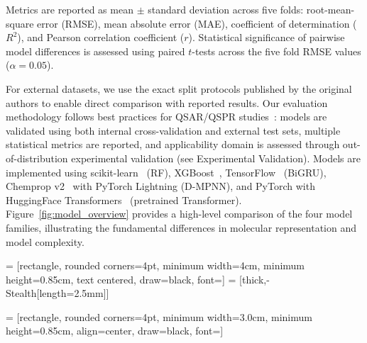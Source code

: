 \documentclass[journal=jcisd8,manuscript=article]{achemso}
\begin{document}
Metrics are reported as mean $\pm$ standard deviation across five folds: root-mean-square error (RMSE), mean absolute error (MAE), coefficient of determination ($R^2$), and Pearson correlation coefficient ($r$).
Statistical significance of pairwise model differences is assessed using paired $t$-tests across the five fold RMSE values ($\alpha = 0.05$).

For external datasets, we use the exact split protocols published by the original authors to enable direct comparison with reported results.
Our evaluation methodology follows best practices for QSAR/QSPR studies~\cite{tropsha2006best, cherkasov2014qsar}: models are validated using both internal cross-validation and external test sets, multiple statistical metrics are reported, and applicability domain is assessed through out-of-distribution experimental validation (see Experimental Validation).
Models are implemented using scikit-learn~\cite{pedregosa2011scikit} (RF), XGBoost~\cite{chen2016xgboost}, TensorFlow~\cite{abadi2016tensorflow} (BiGRU), Chemprop v2~\cite{yangAnalyzingLearnedMolecular2019} with PyTorch Lightning (D-MPNN), and PyTorch with HuggingFace Transformers~\cite{chithrananda2020chemberta} (pretrained Transformer).
Figure~\ref{fig:model_overview} provides a high-level comparison of the four model families, illustrating the fundamental differences in molecular representation and model complexity.


 = [rectangle, rounded corners=4pt, minimum width=4cm, minimum height=0.85cm, text centered, draw=black, font=\small]
 = [thick,-{Stealth[length=2.5mm]}]

 = [rectangle, rounded corners=4pt, minimum width=3.0cm, minimum height=0.85cm, align=center, draw=black, font=\small]
\end{document}
